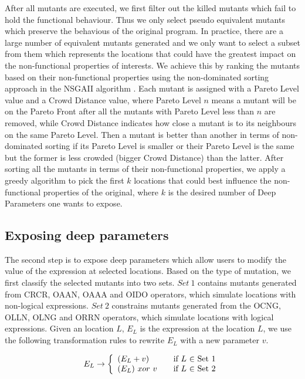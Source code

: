 After all mutants are executed, we first filter out the killed mutants which fail to hold the functional behaviour.  Thus we only select pseudo equivalent mutants which preserve the behavious of the original program. 
In practice, there are a large number of equivalent mutants \cite{5477100} generated and we only want to select a subset from them which represents the locations that could have the greatest impact on the non-functional properties of interests.  
We achieve this by ranking the mutants based on their non-functional properties using the non-dominated sorting approach in the NSGAII algorithm \cite{996017}. Each mutant is assigned with a Pareto Level value and a Crowd Distance value, where Pareto Level $n$ means a mutant will be on the Pareto Front after all the mutants with Pareto Level less than $n$ are removed, while Crowd Distance indicates how close a mutant is to its neighbours on the same Pareto Level. Then a mutant is better than another in terms of non-dominated sorting if its Pareto Level is smaller or their Pareto Level is the same but the former is less crowded (bigger Crowd Distance) than the latter. After sorting all the mutants in terms of their non-functional properties, we apply a greedy algorithm to pick the first $k$ locations that could best influence the non-functional properties of the original, where $k$ is the desired number of Deep Parameters one wants to expose.

\subsection{Exposing deep parameters}
\label{exposing}
The second step is to expose deep parameters which allow users to modify the value of the expression at selected locations. Based on the type of mutation, we first classify the selected mutants into two sets. $Set\ 1$ contains mutants generated from CRCR, OAAN, OAAA and OIDO operators, which simulate locations with non-logical expressions. $Set\ 2$ constrains mutants generated from the OCNG, OLLN, OLNG and ORRN operators, which simulate locations with logical expressions. 
Given an location $L$, $E_L$ is the expression at the location $L$, we use the following transformation rules to rewrite $E_L$ with a new parameter $v$.

\begin{equation}
 E_L \rightarrow \left\{
  \begin{array}{l l}
    (E_L + v) & \quad \text{if $L$ $\in$ Set 1}\\
    (E_L) \ xor \ v & \quad \text{if $L$ $\in$ Set 2}
    \end{array} \right.
\end{equation}

